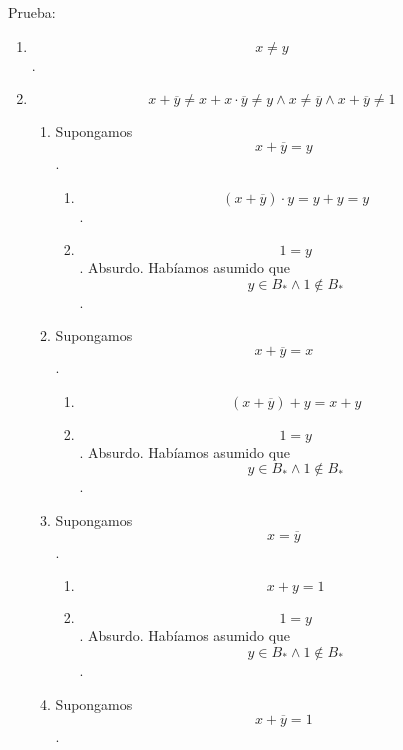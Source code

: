 \documentclass[
]{article}
\providecommand{\tightlist}{%
  \setlength{\itemsep}{0pt}\setlength{\parskip}{0pt}}
\begin{document}
\begin{enumerate}
\begin{enumerate}
\begin{enumerate}
      Prueba:

      \begin{enumerate}
      \def\labelenumiv{\arabic{enumiv}.}
      \item
        \[x \neq y\].
      \item
        \[{{{{x + \overline{y}} \neq {x + {x \cdot \overline{y}}}} \neq {y \land x}} \neq {{\overline{y} \land x} + \overline{y}}} \neq 1\]

        \begin{enumerate}
        \def\labelenumv{\arabic{enumv}.}
        \item
          Supongamos \[{x + \overline{y}} = y\].

          \begin{enumerate}
          \def\labelenumvi{\arabic{enumvi}.}
          \tightlist
          \item
            \[{{{({x + \overline{y}})} \cdot y} = {y + y}} = y\].
          \item
            \[1 = y\]. Absurdo. Habíamos asumido que
            \[{y \in {B_{\ast} \land 1}} \notin B_{\ast}\].
          \end{enumerate}
        \item
          Supongamos \[{x + \overline{y}} = x\].

          \begin{enumerate}
          \def\labelenumvi{\arabic{enumvi}.}
          \tightlist
          \item
            \[{{({x + \overline{y}})} + y} = {x + y}\]
          \item
            \[1 = y\]. Absurdo. Habíamos asumido que
            \[{y \in {B_{\ast} \land 1}} \notin B_{\ast}\].
          \end{enumerate}
        \item
          Supongamos \[x = \overline{y}\].

          \begin{enumerate}
          \def\labelenumvi{\arabic{enumvi}.}
          \tightlist
          \item
            \[{x + y} = 1\]
          \item
            \[1 = y\]. Absurdo. Habíamos asumido que
            \[{y \in {B_{\ast} \land 1}} \notin B_{\ast}\].
          \end{enumerate}
        \item
          Supongamos \[{x + \overline{y}} = 1\].


\end{enumerate}
\end{enumerate}
\end{enumerate}
\end{enumerate}
\end{enumerate}
\end{document}

